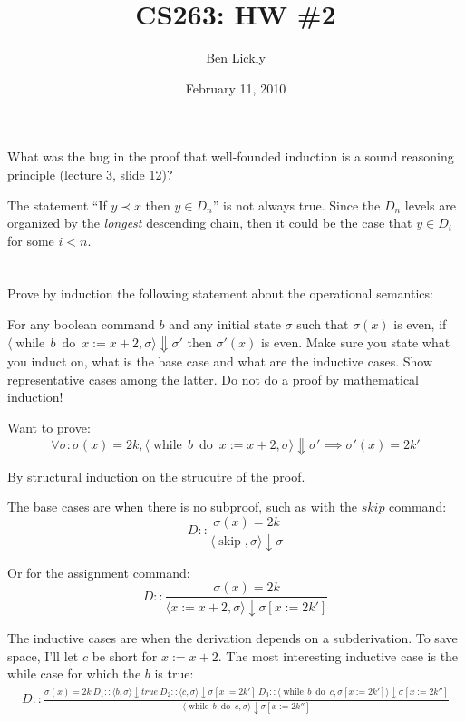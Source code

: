 \documentclass{article}
\title{CS263: HW \#2}
\author{Ben Lickly}
\date{February 11, 2010}
\newcommand{\problem}[1]
{\subsubsection*{} %
\vspace{-16pt} \section{} \vspace{-22pt} \qquad
#1%
\bigskip \bigskip
}
\begin{document}
\maketitle
\problem{
What was the bug in the proof that well-founded induction is a sound
reasoning principle (lecture 3, slide 12)?
}

  The statement ``If $y \prec x$ then $y \in D_n$'' is not always true. Since the
  $D_n$ levels are organized by the \emph{longest} descending chain, then it
  could be the case that $y \in D_i$ for some $i < n$.
  
\problem{
Prove by induction the following statement about the operational semantics:

\newcommand{\while}[2]{\operatorname{while}\, #1\ \operatorname{do}\ #2}

For any boolean command $b$ and any initial state $\sigma$ such that $\sigma(x)$
is even, if $\langle \while{b}{x := x + 2}, \sigma \rangle \Downarrow \sigma'$
then $\sigma'(x)$ is even. Make sure you state what you induct on, what is the
base case and what are the inductive cases. Show representative cases among
the latter. Do not do a proof by mathematical induction!
}

Want to prove:
\[
\forall \sigma : \sigma(x) = 2k, \langle \while{b}{x := x + 2}, \sigma
\rangle \Downarrow \sigma' \implies \sigma'(x) = 2k'
\]

By structural induction on the strucutre of the proof.

\newcommand{\skp}{\operatorname{skip}}
The base cases are when there is no subproof, such as with the $skip$ command:
\[
D :: \frac{\sigma(x) = 2k}{
\langle \skp, \sigma \rangle \downarrow \sigma
}
\]

Or for the assignment command:
\[
D :: \frac{\sigma(x) = 2k}{
\langle x := x+2, \sigma \rangle \downarrow \sigma[x := 2k']
}
\]

The inductive cases are when the derivation depends on a subderivation.
To save space, I'll let $c$ be short for $x := x + 2$.
The most interesting inductive case is the while case for which the $b$ is true:
\begin{align*}
D :: \frac{
\sigma(x) = 2k
\ %
D_1 :: \langle b, \sigma \rangle \downarrow true
\ %
D_2 :: \langle c, \sigma \rangle \downarrow \sigma[x := 2k']
\ %
D_3 :: \langle \while{b}{c}, \sigma[x := 2k'] \rangle \downarrow \sigma[x :=
2k''] }{
\langle \while{b}{c}, \sigma \rangle \downarrow \sigma[x := 2k'']
}
\end{align*}
\end{document}
